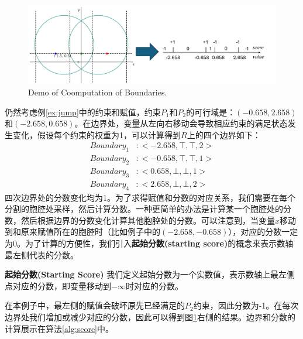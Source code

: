 \begin{example}
\label{ex:jump2}
\begin{figure}[t]
    \centering
    \includegraphics[width=\columnwidth]{Img/boundary.png}
     {Demo of Coomputation of Boundaries.}
\label{fig:boundary}
\end{figure}

仍然考虑例\ref{ex:jump}中的约束和赋值，约束$P_1$和$P_2$的可行域是：$(-0.658, 2.658)$和$(-2.658, 0.658)$。在边界处，变量从左向右移动会导致相应约束的满足状态发生变化，假设每个约束的权重为1，可以计算得到$R$上的四个边界如下：
\begin{align}
Boundary_1 &: <-2.658, \top, \top, 2> \nonumber \\
Boundary_2 &: <-0.658, \top, \top, 1> \nonumber \\
Boundary_3 &: <0.658, \bot, \bot, 1> \nonumber \\
Boundary_4 &: <2.658, \bot, \bot, 2> \nonumber
\end{align}
四次边界处的分数变化均为1。为了求得赋值和分数的对应关系，我们需要在每个分割的胞腔处采样，然后计算分数。一种更简单的办法是计算某一个胞腔处的分数，然后根据边界的分数变化计算其他胞腔处的分数。可以注意到，当变量$x$移动到和原来赋值所在的胞腔时（比如例子中的$(-2.658, -0.658)$），对应的分数一定为0。为了计算的方便性，我们引入\textbf{起始分数(starting score)}的概念来表示数轴最左侧代表的分数。

\begin{definition}{\textbf{起始分数(Starting Score)}}
我们定义起始分数为一个实数值，表示数轴上最左侧点对应的分数，即变量移动到$-\infty$时对应的分数。
\end{definition}
在本例子中，最左侧的赋值会破坏原先已经满足的$P_2$约束，因此分数为-1。在每次边界处我们增加或减少对应的分数，因此可以得到图\ref{fig:boundary}右侧的结果。边界和分数的计算展示在算法\ref{alg:score}中。
\end{example}

